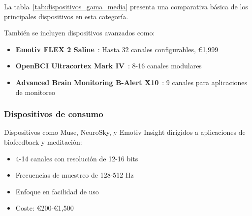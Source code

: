 La tabla~\ref{tab:dispositivos_gama_media} presenta una comparativa básica de los principales dispositivos en esta categoría.

\begin{table}[hp!]
\centering
{}
\caption{Comparativa de dispositivos EEG de investigación de gama media}
\label{tab:dispositivos_gama_media}
\end{table}

También se incluyen dispositivos avanzados como:
\begin{itemize}
    \item \textbf{Emotiv FLEX 2 Saline}~\cite{emotiv_flex_saline}: Hasta 32 canales configurables, €1,999
    \item \textbf{OpenBCI Ultracortex Mark IV}~\cite{openbci_ultracortex}: 8-16 canales modulares
    \item \textbf{Advanced Brain Monitoring B-Alert X10}~\cite{abm_b_alert}: 9 canales para aplicaciones de monitoreo
\end{itemize}

\subsubsection{Dispositivos de consumo}
Dispositivos como Muse, NeuroSky, y Emotiv Insight dirigidos a aplicaciones de biofeedback y meditación:
\begin{itemize}
    \item 4-14 canales con resolución de 12-16 bits
    \item Frecuencias de muestreo de 128-512 Hz
    \item Enfoque en facilidad de uso
    \item Coste: €200-€1,500
\end{itemize}

